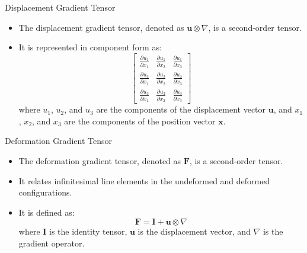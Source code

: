 \documentclass{beamer}
\begin{document}
\begin{frame}{Displacement Gradient Tensor}
    \begin{itemize}
        \item The displacement gradient tensor, denoted as \(\mathbf{u} \otimes \nabla\), is a second-order tensor.
        \item It is represented in component form as:
            \[
            \begin{bmatrix}
                \frac{\partial u_1}{\partial x_1} & \frac{\partial u_1}{\partial x_2} & \frac{\partial u_1}{\partial x_3} \\
                \frac{\partial u_2}{\partial x_1} & \frac{\partial u_2}{\partial x_2} & \frac{\partial u_2}{\partial x_3} \\
                \frac{\partial u_3}{\partial x_1} & \frac{\partial u_3}{\partial x_2} & \frac{\partial u_3}{\partial x_3}
            \end{bmatrix}
            \]
            where \(u_1\), \(u_2\), and \(u_3\) are the components of the displacement vector \(\mathbf{u}\), and \(x_1\), \(x_2\), and \(x_3\) are the components of the position vector \(\mathbf{x}\).
    \end{itemize}
\end{frame}

\begin{frame}{Deformation Gradient Tensor}
    \begin{itemize}
        \item The deformation gradient tensor, denoted as \(\mathbf{F}\), is a second-order tensor.
        \item It relates infinitesimal line elements in the undeformed and deformed configurations.
        \item It is defined as:
            \[
            \mathbf{F} = \mathbf{I} + \mathbf{u} \otimes \nabla
            \]
            where \(\mathbf{I}\) is the identity tensor, \(\mathbf{u}\) is the displacement vector, and \(\nabla\) is the gradient operator.
            \end{itemize}
            \end{frame}
\end{document}
